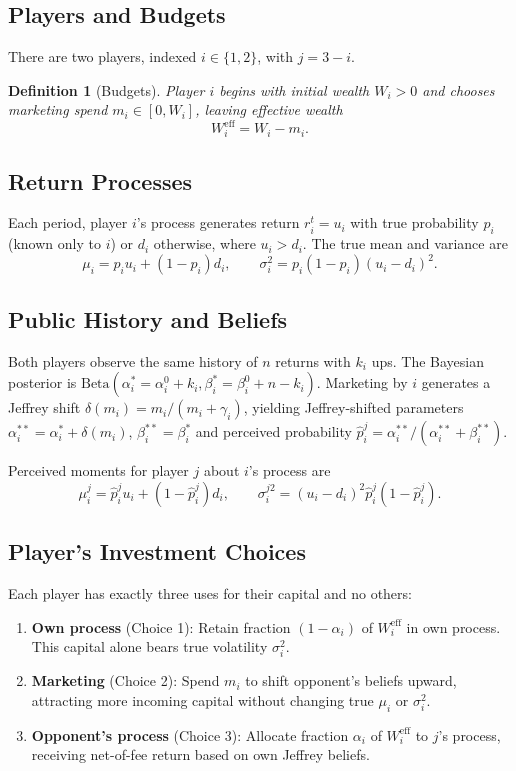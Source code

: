 \documentclass[12pt,a4paper]{article}
\newtheorem{definition}{Definition}[section]
\newcommand{\1}{\mathbf{1}}
\begin{document}
\subsection{Players and Budgets}

There are two players, indexed \(i \in \{1, 2\}\), with \(j = 3 - i\).

\begin{definition}[Budgets]
Player \(i\) begins with initial wealth \(W_i > 0\) and chooses marketing spend \(m_i \in [0, W_i]\), leaving effective wealth
\[
W_i^{\mathrm{eff}} = W_i - m_i.
\]
\end{definition}

\subsection{Return Processes}

Each period, player \(i\)'s process generates return \(r_i^t = u_i\) with true probability \(p_i\) (known only to \(i\)) or \(d_i\) otherwise, where \(u_i > d_i\). The true mean and variance are
\[
\mu_i = p_i u_i + (1-p_i) d_i, \qquad \sigma_i^2 = p_i(1-p_i)(u_i - d_i)^2.
\]

\subsection{Public History and Beliefs}

Both players observe the same history of \(n\) returns with \(k_i\) ups. The Bayesian posterior is \(\mathrm{Beta}(\alpha_i^* = \alpha_i^0 + k_i, \beta_i^* = \beta_i^0 + n - k_i)\). Marketing by \(i\) generates a Jeffrey shift \(\delta(m_i) = m_i/(m_i + \gamma_i)\), yielding Jeffrey-shifted parameters \(\alpha_i^{**} = \alpha_i^* + \delta(m_i)\), \(\beta_i^{**} = \beta_i^*\) and perceived probability \(\hat{p}_i^j = \alpha_i^{**}/(\alpha_i^{**} + \beta_i^{**})\).

Perceived moments for player \(j\) about \(i\)'s process are
\[
\mu_i^j = \hat{p}_i^j u_i + (1 - \hat{p}_i^j) d_i, \qquad \sigma_i^{j2} = (u_i - d_i)^2 \hat{p}_i^j (1 - \hat{p}_i^j).
\]

\subsection{Player's Investment Choices}

Each player has exactly three uses for their capital and no others:

\begin{enumerate}
  \item \textbf{Own process} (Choice 1): Retain fraction \((1-\alpha_i)\) of \(W_i^{\mathrm{eff}}\) in own process. This capital alone bears true volatility \(\sigma_i^2\).
  \item \textbf{Marketing} (Choice 2): Spend \(m_i\) to shift opponent's beliefs upward, attracting more incoming capital without changing true \(\mu_i\) or \(\sigma_i^2\).
  \item \textbf{Opponent's process} (Choice 3): Allocate fraction \(\alpha_i\) of \(W_i^{\mathrm{eff}}\) to \(j\)'s process, receiving net-of-fee return based on own Jeffrey beliefs.
\end{enumerate}
\end{document}
